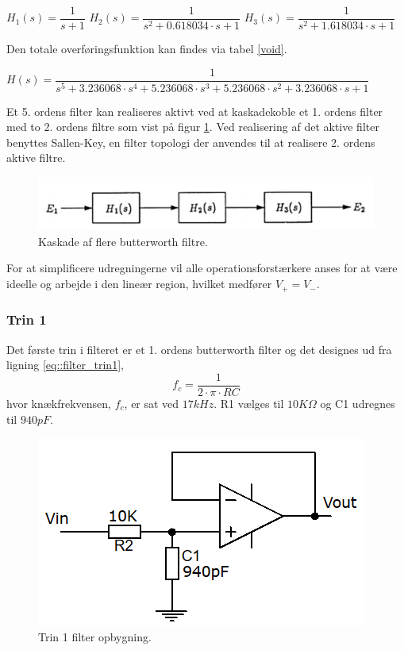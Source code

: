\begin{center}
 $H_1(s) = \dfrac{1}{s+1}$ \hspace{1.5cm}
 $H_2(s) = \dfrac{1}{s^2 + 0.618034\cdot s + 1}$ \hspace{1.5cm}
 $H_3(s) = \dfrac{1}{s^2 + 1.618034\cdot s + 1}$
\end{center}

Den totale overføringsfunktion kan findes via tabel \ref{void}.\\ 
\begin{center}
 $H(s) = \dfrac{1}{s^5+3.236068\cdot s^4 + 5.236068\cdot s^3 + 5.236068\cdot s^2 + 3.236068\cdot s +1}$
\end{center}
Et 5. ordens filter kan realiseres aktivt ved at kaskadekoble et 1. ordens filter med to 2. ordens filtre som vist på figur  \ref{fig::anfilter_kask_butterworth}. Ved realisering af det aktive filter benyttes Sallen-Key, en filter topologi der anvendes til at realisere 2. ordens aktive filtre. 

\begin{figure}[h!]
	\centering
	\includegraphics[scale=0.7]{./billeder/Kaskade}
	\caption{Kaskade af flere butterworth filtre.}
	\label{fig::anfilter_kask_butterworth}
\end{figure}
\FloatBlock

For at simplificere udregningerne vil alle operationsforstærkere anses for at være ideelle og arbejde i den lineær region, hvilket medfører $V_+ = V_-$.

\subsubsection{Trin 1} 
Det første trin i filteret er et 1. ordens butterworth filter og det designes ud fra ligning \ref{eq::filter_trin1},
\begin{equation}
	f_c = \dfrac{1}{2\cdot\pi\cdot R C} \label{eq::filter_trin1}
\end{equation} 	
hvor knækfrekvensen, $f_c$, er sat ved $17kHz$.
R1 vælges til $10K\Omega$ og C1 udregnes til $940pF$.
\begin{figure}[h!]
	\centering
	\includegraphics[scale=0.3]{./billeder/stage1}
	\caption{Trin 1 filter opbygning.}
	\label{fig::stage1}
\end{figure}

